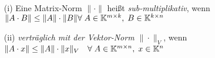\begin{Definition}
\quad \\
\begin{enumerate}
  \item[(i)] Eine Matrix-Norm $\|\cdot\|$ heißt \textit{sub-multiplikativ}, wenn
  $\|A \cdot B\| \le \|A\| \cdot \|B\| \newline \forall \; A \in \KK^{m \times k}, \; B \in \KK^{k \times n}$
  \item[(ii)] \textit{verträglich mit der Vektor-Norm $\| \cdot \|_V$}, wenn
  $\|A \cdot x\| \le \|A\| \cdot \|x\|_V \quad \forall \; A \in \mathbb K^{m \times n}, \; x \in \mathbb K^n$
\end{enumerate}
\end{Definition}





